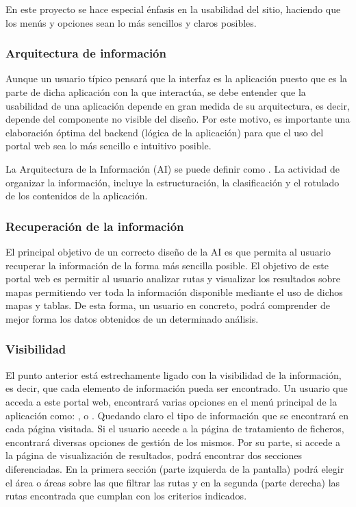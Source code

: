 En este proyecto se hace especial énfasis en la usabilidad del sitio, haciendo que los menús y
opciones sean lo más sencillos y claros posibles.

\subsubsection{Arquitectura de información}

Aunque un usuario típico pensará que la interfaz es la aplicación puesto que es la parte de dicha aplicación con la que interactúa, se debe entender que la usabilidad de una aplicación depende en gran medida de su arquitectura, es decir, depende del componente no visible del diseño. Por este motivo, es importante una elaboración óptima del backend (lógica de la aplicación) para que el uso del portal web sea lo más sencillo e intuitivo posible.

La Arquitectura de la Información (AI) se puede definir como . La actividad de organizar la información, incluye la estructuración, la clasificación y el rotulado de los contenidos de la aplicación.

\subsubsection{Recuperación de la información}

El principal objetivo de un correcto diseño de la AI es que permita al usuario recuperar la información de la forma más sencilla posible. El objetivo de este portal web es permitir al usuario analizar rutas y visualizar los resultados sobre mapas permitiendo ver toda la información disponible mediante el uso de dichos mapas y tablas. De esta forma, un usuario en concreto, podrá comprender de mejor forma los datos obtenidos de un determinado análisis.


\subsubsection{Visibilidad}

El punto anterior está estrechamente ligado con la visibilidad de la información, es decir, que cada elemento de información pueda ser encontrado. Un usuario que acceda a este portal web, encontrará varias opciones en el menú principal de la aplicación como: ,  o . Quedando
claro el tipo de información que se encontrará en cada página visitada. Si el usuario accede a la página de tratamiento de ficheros, encontrará diversas opciones de gestión de los mismos. Por su parte, si accede a la página de visualización de resultados, podrá encontrar dos secciones diferenciadas. En la primera sección (parte izquierda de la pantalla) podrá elegir el área o áreas sobre las que filtrar las rutas y en la segunda (parte derecha) las rutas encontrada que cumplan con los criterios indicados.

